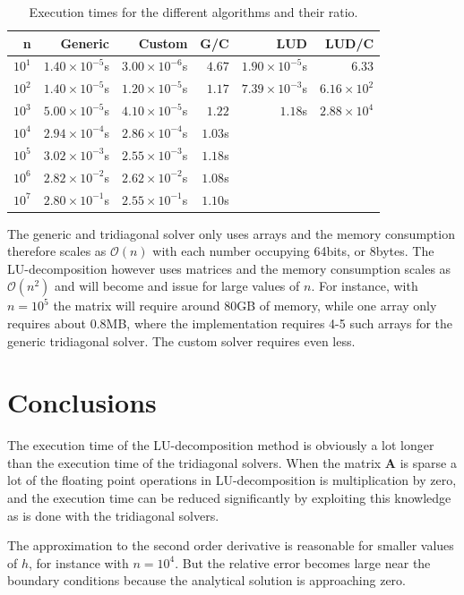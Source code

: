 \documentclass{article}
\begin{document}
\begin{table}[h]
\centering
\begin{tabular}{r|r|r|r|r|r}
n & Generic & Custom & G/C & LUD & LUD/C \\
\hline
$10^{1}$ & $1.40 \times 10^{-5}$s & $3.00 \times 10^{-6}$s & $4.67$ & $1.90 \times 10^{-5}$s & $6.33$ \\
$10^{2}$ & $1.40 \times 10^{-5}$s & $1.20 \times 10^{-5}$s & $1.17$ & $7.39 \times 10^{-3}$s & $6.16 \times 10^{2}$ \\
$10^{3}$ & $5.00 \times 10^{-5}$s & $4.10 \times 10^{-5}$s & $1.22$ & $1.18$s & $2.88 \times 10^{4}$ \\
$10^{4}$ & $2.94 \times 10^{-4}$s & $2.86 \times 10^{-4}$s & $1.03$s & & \\
$10^{5}$ & $3.02 \times 10^{-3}$s & $2.55 \times 10^{-3}$s & $1.18$s & & \\
$10^{6}$ & $2.82 \times 10^{-2}$s & $2.62 \times 10^{-2}$s & $1.08$s & & \\
$10^{7}$ & $2.80 \times 10^{-1}$s & $2.55 \times 10^{-1}$s & $1.10$s & & \\
\hline
\end{tabular}
\caption{Execution times for the different algorithms and their ratio.}
\label{tab:times}
\end{table}

The generic and tridiagonal solver only uses arrays and the memory consumption therefore scales as $\mathcal{O}(n)$ with each number occupying 64bits, or 8bytes. The LU-decomposition however uses matrices and the memory consumption scales as $\mathcal{O}(n^2)$ and will become and issue for large values of $n$. For instance, with $n=10^5$ the matrix will require around 80GB of memory, while one array only requires about 0.8MB, where the implementation requires 4-5 such arrays for the generic tridiagonal solver. The custom solver requires even less.


\section{Conclusions}
\label{sec:conclusions}
The execution time of the LU-decomposition method is obviously a lot longer than the execution time of the tridiagonal solvers. When the matrix $\bm{A}$ is sparse a lot of the floating point operations in LU-decomposition is multiplication by zero, and the execution time can be reduced significantly by exploiting this knowledge as is done with the tridiagonal solvers. 

The approximation to the second order derivative is reasonable for smaller values of $h$, for instance with $n=10^4$. But the relative error becomes large near the boundary conditions because the analytical solution is approaching zero.  
\end{document}
